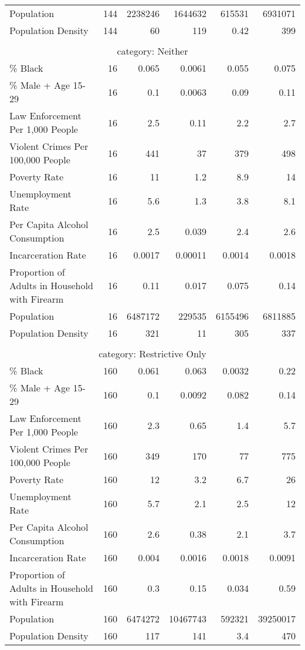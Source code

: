\begin{table}[!htbp]
{\begin{tabular}{lrrrrr}
Population & 144 & 2238246 & 1644632 & 615531 & 6931071 \\ 
Population Density & 144 & 60 & 119 & 0.42 & 399 \\ 
 &  &  &  &  &  \\ 
\multicolumn{6}{c}{category: Neither} \\ 
\% Black & 16 & 0.065 & 0.0061 & 0.055 & 0.075 \\ 
\% Male + Age 15-29 & 16 & 0.1 & 0.0063 & 0.09 & 0.11 \\ 
Law Enforcement Per 1,000 People & 16 & 2.5 & 0.11 & 2.2 & 2.7 \\ 
Violent Crimes Per 100,000 People & 16 & 441 & 37 & 379 & 498 \\ 
Poverty Rate & 16 & 11 & 1.2 & 8.9 & 14 \\ 
Unemployment Rate & 16 & 5.6 & 1.3 & 3.8 & 8.1 \\ 
Per Capita Alcohol Consumption & 16 & 2.5 & 0.039 & 2.4 & 2.6 \\ 
Incarceration Rate & 16 & 0.0017 & 0.00011 & 0.0014 & 0.0018 \\ 
Proportion of Adults in Household with Firearm & 16 & 0.11 & 0.017 & 0.075 & 0.14 \\ 
Population & 16 & 6487172 & 229535 & 6155496 & 6811885 \\ 
Population Density & 16 & 321 & 11 & 305 & 337 \\ 
 &  &  &  &  &  \\ 
\multicolumn{6}{c}{category: Restrictive Only} \\ 
\% Black & 160 & 0.061 & 0.063 & 0.0032 & 0.22 \\ 
\% Male + Age 15-29 & 160 & 0.1 & 0.0092 & 0.082 & 0.14 \\ 
Law Enforcement Per 1,000 People & 160 & 2.3 & 0.65 & 1.4 & 5.7 \\ 
Violent Crimes Per 100,000 People & 160 & 349 & 170 & 77 & 775 \\ 
Poverty Rate & 160 & 12 & 3.2 & 6.7 & 26 \\ 
Unemployment Rate & 160 & 5.7 & 2.1 & 2.5 & 12 \\ 
Per Capita Alcohol Consumption & 160 & 2.6 & 0.38 & 2.1 & 3.7 \\ 
Incarceration Rate & 160 & 0.004 & 0.0016 & 0.0018 & 0.0091 \\ 
Proportion of Adults in Household with Firearm & 160 & 0.3 & 0.15 & 0.034 & 0.59 \\ 
Population & 160 & 6474272 & 10467743 & 592321 & 39250017 \\ 
Population Density & 160 & 117 & 141 & 3.4 & 470\\ 
\hline
\hline
\end{tabular}
}
\end{table}

